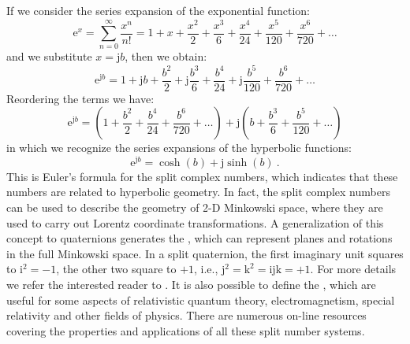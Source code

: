 If we consider the series expansion of the exponential function:
\[
	\mathrm{e}^x = \sum_{n=0}^{\infty}\frac{x^n}{n!} = 1+ x+\frac{x^2}{2}+\frac{x^3}{6}+\frac{x^4}{24}+\frac{x^5}{120}+\frac{x^6}{720}+\ldots
\]
and we substitute $x=\mathrm{j}b$, then we obtain:
\[
	\mathrm{e}^{\mathrm{j}b} = 1 + \mathrm{j}b + \frac{b^2}{2}+\mathrm{j}\frac{b^3}{6}+\frac{b^4}{24}+\mathrm{j}\frac{b^5}{120}+\frac{b^6}{720}+\ldots
\]
Reordering the terms we have:
\[
	\mathrm{e}^{\mathrm{j}b} = \left(1 +  \frac{b^2}{2}+\frac{b^4}{24}+\frac{b^6}{720}+\ldots\right) + \mathrm{j}\left(b +\frac{b^3}{6}+\frac{b^5}{120}+\ldots\right)
\]
in which we recognize the series expansions of the hyperbolic functions:
\[
	\mathrm{e}^{\mathrm{j}b} = \cosh(b) + \mathrm{j}\sinh(b)\ .
\]
This is Euler's formula for the split complex numbers, which indicates that these numbers are related to hyperbolic geometry.  In fact, the split complex numbers can be used to describe the geometry of 2-D Minkowski space, where they are used to carry out Lorentz coordinate transformations.  A generalization of this concept to quaternions generates the , which can represent planes and  rotations in the full Minkowski space.  In a split quaternion, the first imaginary unit squares to $\mathrm{i}^2=-1$, the other two square to $+1$, i.e., $\mathrm{j}^2=\mathrm{k}^2=\mathrm{ijk}=+1$.  For more details we refer the interested reader to \cite{ozturk2022a}.  It is also possible to define the , which are useful for some aspects of relativistic quantum theory, electromagnetism, special relativity and other fields of physics.  There are numerous on-line resources covering the properties and applications of all these split number systems.




